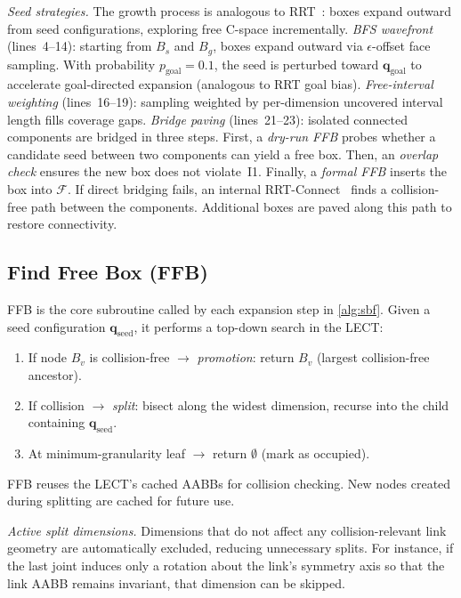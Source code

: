 \documentclass[letterpaper, conference]{IEEEtran}
\newcommand{\calF}{\mathcal{F}}
\begin{document}
\emph{Seed strategies.}
The growth process is analogous to RRT~\cite{lavalle1998rapidly}: boxes
expand outward from seed configurations, exploring free C-space
incrementally.
\emph{BFS wavefront} (lines~4--14): starting from $B_s$ and $B_g$, boxes
expand outward via $\epsilon$-offset face sampling.
With probability $p_\text{goal}=0.1$, the seed is perturbed toward
$\bm{q}_\text{goal}$ to accelerate goal-directed expansion
(analogous to RRT goal bias).
\emph{Free-interval weighting} (lines~16--19): sampling weighted by
per-dimension uncovered interval length fills coverage gaps.
\emph{Bridge paving} (lines~21--23): isolated connected components are
bridged in three steps.
First, a \emph{dry-run FFB} probes whether a candidate seed between two
components can yield a free box.
Then, an \emph{overlap check} ensures the new box does not violate~I1.
Finally, a \emph{formal FFB} inserts the box into $\calF$.
If direct bridging fails, an internal RRT-Connect~\cite{kuffner2000rrt}
finds a collision-free path between the components.
Additional boxes are paved along this path to restore connectivity.

\subsection{Find Free Box (FFB)}\label{sec:sbf_construction}

FFB is the core subroutine called by each expansion step in
\cref{alg:sbf}.
Given a seed configuration $\bm{q}_\text{seed}$, it performs a top-down
search in the LECT:
\begin{enumerate}
\item If node $B_v$ is collision-free $\to$ \emph{promotion}: return $B_v$
  (largest collision-free ancestor).
\item If collision $\to$ \emph{split}: bisect along the widest dimension,
  recurse into the child containing $\bm{q}_\text{seed}$.
\item At minimum-granularity leaf $\to$ return $\emptyset$ (mark as occupied).
\end{enumerate}
FFB reuses the LECT's cached AABBs for collision checking.
New nodes created during splitting are cached for future use.

\emph{Active split dimensions.}
Dimensions that do not affect any collision-relevant link geometry
are automatically excluded, reducing unnecessary splits.
For instance, if the last joint induces only a rotation about the link's
symmetry axis so that the link AABB remains invariant, that dimension
can be skipped.
\end{document}
